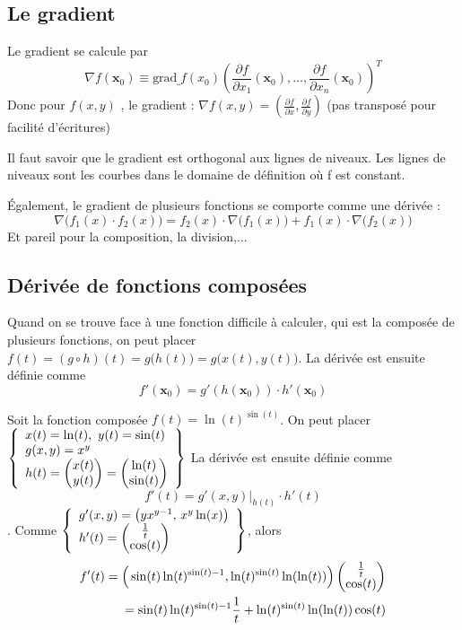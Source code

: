 \documentclass[12pt,a4paper]{article}
\renewcommand{\)}{\right)}
\renewcommand{\(}{\left(}
\begin{document}
\subsection{Le gradient}
Le gradient se calcule par 
\begin{equation*}
	\nabla f(\textbf{x}_0) \equiv \text{grad} \underbracket{\ }f(x_0)\(\frac{\partial f}{\partial x_1}(\textbf{x}_0),\ldots,\frac{\partial f}{\partial x_n}(\textbf{x}_0)\)^T
\end{equation*}
Donc pour $f(x,y)$ , le gradient : $\nabla f(x,y) = \(\frac{\partial f}{\partial x}, \frac{\partial f}{\partial y}\)$ (pas transposé pour facilité d'écritures)			

Il faut savoir que le gradient est orthogonal aux lignes de niveaux. Les lignes de niveaux sont les courbes dans le domaine de définition où f est constant.

Également, le gradient de plusieurs fonctions se comporte comme une dérivée :
	\[\nabla\big(f_1(x)\cdot f_2(x)\big) = f_2(x) \cdot\nabla \big(f_1(x)\big) + f_1(x) \cdot \nabla \big(f_2(x)\big)\]
	Et pareil pour la composition, la division,...
\subsection{Dérivée de fonctions composées}
Quand on se trouve face à une fonction difficile à calculer, qui est la composée de plusieurs fonctions, on peut placer $f(t) = (g\circ h)(t) = g\big(h(t)\big) = g\big(x(t),y(t)\big)$. La dérivée est ensuite définie comme \[f'(\textbf{x}_0) = g'(h(\textbf{x}_0)) \cdot h'(\textbf{x}_0)\]
\begin{exemple}
	Soit la fonction composée $f(t) = \ln(t)^{\sin(t)}$. On peut placer 
	$\left\{\begin{array}{l}
		x(t) = \ln(t),\ y(t) = \sin(t)\\		
		g(x,y) = x^y\\
		h(t) = \begin{pmatrix} x(t) \\ y(t) \end{pmatrix} = \begin{pmatrix} \ln(t) \\ \sin(t) \end{pmatrix}
	\end{array}\right\}$  La dérivée est ensuite définie comme \[f'(t) = \left.g'(x,y)\right|_{h(t)} \cdot h'(t)\]. Comme 
	$\left\{\begin{array}{l}
		g'(x,y) = \big(yx^{y-1},\, x^y \ln(x)\big)\\
		h'(t) = \begin{pmatrix} \frac{1}{t} \\ \cos(t) \end{pmatrix}
	\end{array}\right\}$, alors 
	\begin{align*}
	f'(t) =  \Big(\sin(t)\ln(t)^{\sin(t)-1},\ln(t)^{\sin(t)}\ln(\ln(t))\Big)\begin{pmatrix} \frac{1}{t} \\ \cos(t) \end{pmatrix}\\
	= \sin(t)\ln(t)^{\sin(t)-1} \frac{1}{t} + \ln(t)^{\sin(t)}\ln(\ln(t)) \cos(t)
	\end{align*}
\end{exemple}
\end{document}
